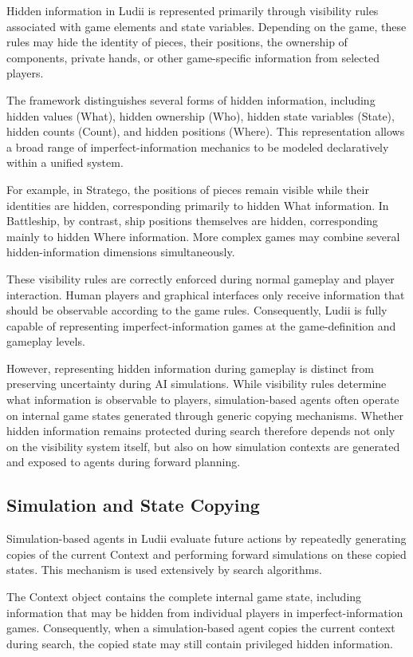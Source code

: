 Hidden information in Ludii is represented primarily through visibility rules associated with game elements and state variables. Depending on the game, these rules may hide the identity of pieces, their positions, the ownership of components, private hands, or other game-specific information from selected players.

The framework distinguishes several forms of hidden information, including hidden values (What), hidden ownership (Who), hidden state variables (State), hidden counts (Count), and hidden positions (Where)\cite{piette2021ludii_logic}. This representation allows a broad range of imperfect-information mechanics to be modeled declaratively within a unified system.

For example, in Stratego, the positions of pieces remain visible while their identities are hidden, corresponding primarily to hidden What information. In Battleship, by contrast, ship positions themselves are hidden, corresponding mainly to hidden Where information. More complex games may combine several hidden-information dimensions simultaneously.

These visibility rules are correctly enforced during normal gameplay and player interaction. Human players and graphical interfaces only receive information that should be observable according to the game rules. Consequently, Ludii is fully capable of representing imperfect-information games at the game-definition and gameplay levels.

However, representing hidden information during gameplay is distinct from preserving uncertainty during AI simulations. While visibility rules determine what information is observable to players, simulation-based agents often operate on internal game states generated through generic copying mechanisms. Whether hidden information remains protected during search therefore depends not only on the visibility system itself, but also on how simulation contexts are generated and exposed to agents during forward planning.

\subsection{Simulation and State Copying}
Simulation-based agents in Ludii evaluate future actions by repeatedly generating copies of the current Context and performing forward simulations on these copied states. This mechanism is used extensively by search algorithms.

The Context object contains the complete internal game state, including information that may be hidden from individual players in imperfect-information games. Consequently, when a simulation-based agent copies the current context during search, the copied state may still contain privileged hidden information.

